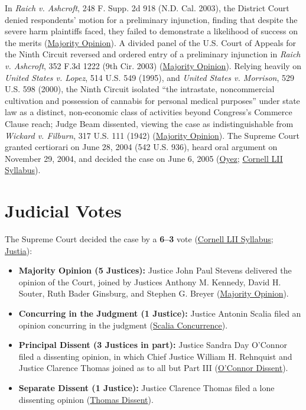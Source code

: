 \documentclass[12pt]{article}
\begin{document}
In \textit{Raich v. Ashcroft}, 248 F. Supp. 2d 918 (N.D. Cal. 2003), the District Court denied respondents' motion for a preliminary injunction, finding that despite the severe harm plaintiffs faced, they failed to demonstrate a likelihood of success on the merits (\href{https://www.law.cornell.edu/supct/html/03-1454.ZO.html}{Majority Opinion}). A divided panel of the U.S. Court of Appeals for the Ninth Circuit reversed and ordered entry of a preliminary injunction in \textit{Raich v. Ashcroft}, 352 F.3d 1222 (9th Cir. 2003) (\href{https://www.law.cornell.edu/supct/html/03-1454.ZO.html}{Majority Opinion}). Relying heavily on \textit{United States v. Lopez}, 514 U.S. 549 (1995), and \textit{United States v. Morrison}, 529 U.S. 598 (2000), the Ninth Circuit isolated ``the intrastate, noncommercial cultivation and possession of cannabis for personal medical purposes'' under state law as a distinct, non-economic class of activities beyond Congress's Commerce Clause reach; Judge Beam dissented, viewing the case as indistinguishable from \textit{Wickard v. Filburn}, 317 U.S. 111 (1942) (\href{https://www.law.cornell.edu/supct/html/03-1454.ZO.html}{Majority Opinion}). The Supreme Court granted certiorari on June 28, 2004 (542 U.S. 936), heard oral argument on November 29, 2004, and decided the case on June 6, 2005 (\href{https://www.oyez.org/cases/2004/03-1454}{Oyez}; \href{https://www.law.cornell.edu/supct/html/03-1454.ZS.html}{Cornell LII Syllabus}).

\section{Judicial Votes}

The Supreme Court decided the case by a \textbf{6--3} vote (\href{https://www.law.cornell.edu/supct/html/03-1454.ZS.html}{Cornell LII Syllabus}; \href{https://supreme.justia.com/cases/federal/us/545/1/}{Justia}):
\begin{itemize}
\item \textbf{Majority Opinion (5 Justices):} Justice John Paul Stevens delivered the opinion of the Court, joined by Justices Anthony M. Kennedy, David H. Souter, Ruth Bader Ginsburg, and Stephen G. Breyer (\href{https://www.law.cornell.edu/supct/html/03-1454.ZO.html}{Majority Opinion}).
\item \textbf{Concurring in the Judgment (1 Justice):} Justice Antonin Scalia filed an opinion concurring in the judgment (\href{https://www.law.cornell.edu/supct/html/03-1454.ZC.html}{Scalia Concurrence}).
\item \textbf{Principal Dissent (3 Justices in part):} Justice Sandra Day O'Connor filed a dissenting opinion, in which Chief Justice William H. Rehnquist and Justice Clarence Thomas joined as to all but Part III (\href{https://www.law.cornell.edu/supct/html/03-1454.ZD.html}{O'Connor Dissent}).
\item \textbf{Separate Dissent (1 Justice):} Justice Clarence Thomas filed a lone dissenting opinion (\href{https://www.law.cornell.edu/supct/html/03-1454.ZD1.html}{Thomas Dissent}).
\end{itemize}
\end{document}
